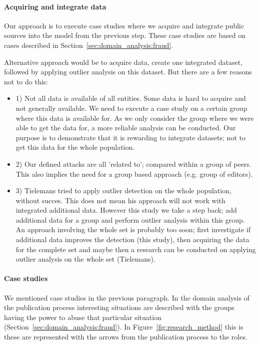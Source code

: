 \documentclass{ou-report}
\begin{document}
\paragraph{Acquiring and integrate data}
Our approach is to execute case studies where we acquire and integrate 
public sources into the model from the previous step. These case studies are 
based on cases described in Section~\ref{sec:domain_analysis:fraud}.

Alternative approach would be to acquire data, create one integrated dataset, 
followed by applying outlier analysis on this dataset. 
But there are a few reasons not to do this:
\begin{itemize}
    \item 1) Not all data is available of all entities. Some data is hard to 
    acquire and not gene\-rally available. We need to
    execute a case study on a certain group where this data is available for.
    As we only consider the group where we were able to get the data for, a 
    more reliable analysis can be conducted. Our purpose is to demonstrate that it is 
    rewarding to integrate datasets; not to get this data for the whole population.
    \item 2) Our defined attacks are all 'related to'; compared within a group of
    peers. This also implies the need for a group based approach (e.g. group 
    of editors).
    \item 3) Tielemans tried to apply outlier detection on the whole population, 
    without succes. This does not mean his approach will not work with integrated 
    additional data. However this study we take a step back; add additional data 
    for a group and perform outlier analysis within this group. An approach 
    involving the whole set is probably too soon; first investigate if additional 
    data improves the detection (this study), then acquiring the data for the 
    complete set and maybe then a research can be conducted on applying outlier 
    analysis on the whole set (Tielemans).
\end{itemize}

\paragraph{Case studies}
We mentioned case studies in the previous paragraph. In the domain analysis of the 
publication process interesting situations are 
described with the groups having the power to abuse that particular situation
(Section~\ref{sec:domain_analysis:fraud}). In Figure~\ref{fig:research_method} this
is these are represented with the arrows from the publication process to the roles.
\end{document}
